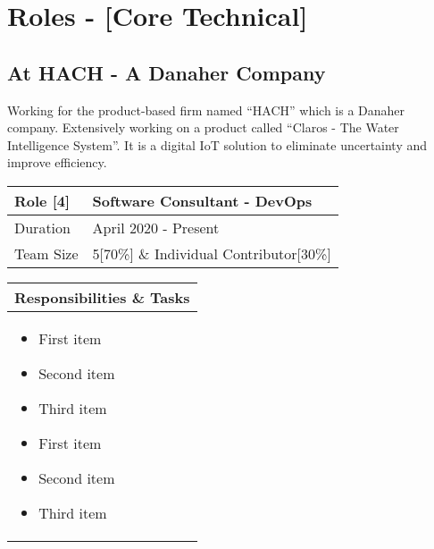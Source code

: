 \documentclass[11pt, a4paper]{article}
\begin{document}
\section*{Roles - [Core Technical]}
	\subsection*{At HACH - A Danaher Company}
Working for the product-based firm named “HACH” which is a Danaher company.  Extensively working on a product called “Claros - The Water Intelligence System”. It is a digital IoT solution to eliminate uncertainty and improve efficiency. \\

\noindent\begin{tabular}{|p{1in}|p{5.95in}|}
\hline
\rowcolor{black!20} Role [4] & Software Consultant - DevOps\\
\hline
Duration & April 2020 - Present\\
\hline
Team Size & 5[70\%] \& Individual Contributor[30\%]\\
\hline
\end{tabular}
\newline
\vspace*{1mm}
\newline
\begin{tabular}{|p{7.122in}|}
\hline
\rowcolor{black!5} Responsibilities \& Tasks\\
\hline
\begin{itemize}[noitemsep, nolistsep]
\item First item
\item Second item
\item Third item
\item First item
\item Second item
\item Third item
\end{itemize} \\
\hline
\end{tabular}
\pagebreak
\end{document}
